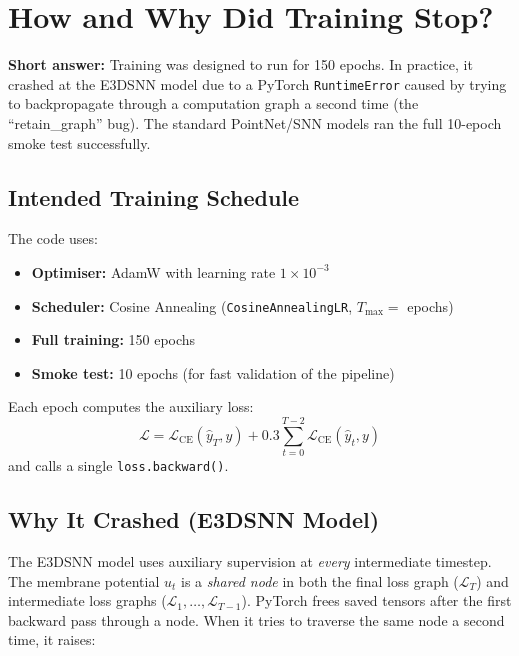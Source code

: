 \documentclass[11pt,a4paper]{article}
\begin{document}
\section{How and Why Did Training Stop?}

\begin{answerbox}
\textbf{Short answer:} Training was designed to run for 150 epochs. In practice,
it crashed at the E3DSNN model due to a PyTorch \texttt{RuntimeError} caused by
trying to backpropagate through a computation graph a second time (the
``retain\_graph'' bug). The standard PointNet/SNN models ran the full 10-epoch
smoke test successfully.
\end{answerbox}

\subsection{Intended Training Schedule}

The code uses:
\begin{itemize}
  \item \textbf{Optimiser:} AdamW with learning rate $1\times10^{-3}$
  \item \textbf{Scheduler:} Cosine Annealing (\texttt{CosineAnnealingLR},
        $T_{\max} = $ epochs)
  \item \textbf{Full training:} 150 epochs
  \item \textbf{Smoke test:} 10 epochs (for fast validation of the pipeline)
\end{itemize}

Each epoch computes the auxiliary loss:
\[
  \mathcal{L} = \mathcal{L}_{\text{CE}}(\hat{y}_T, y)
              + 0.3 \sum_{t=0}^{T-2} \mathcal{L}_{\text{CE}}(\hat{y}_t, y)
\]
and calls a single \texttt{loss.backward()}.

\subsection{Why It Crashed (E3DSNN Model)}

The E3DSNN model uses auxiliary supervision at \emph{every} intermediate
timestep. The membrane potential $u_t$ is a \emph{shared node} in both the
final loss graph ($\mathcal{L}_T$) and intermediate loss graphs
($\mathcal{L}_1, \ldots, \mathcal{L}_{T-1}$). PyTorch frees saved tensors
after the first backward pass through a node. When it tries to traverse the
same node a second time, it raises:
\end{document}
